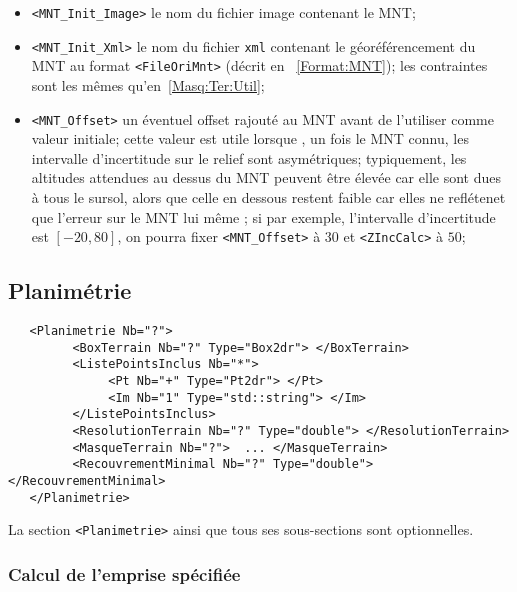 \begin{itemize}
   \item {\tt <MNT\_Init\_Image>} le nom du fichier image contenant le MNT;

   \item {\tt <MNT\_Init\_Xml>} le nom du fichier {\tt xml} contenant
         le g\'eor\'ef\'erencement du MNT au format {\tt <FileOriMnt>} 
         (d\'ecrit en ~\ref{Format:MNT}); les contraintes sont les 
         m\^emes qu'en~\ref{Masq:Ter:Util};

   \item {\tt <MNT\_Offset>} un \'eventuel offset rajout\'e au MNT
          avant de l'utiliser comme valeur initiale;
         cette valeur est utile lorsque , un fois
         le MNT connu, les  intervalle d'incertitude
         sur le relief sont asym\'etriques; typiquement, les altitudes
         attendues au dessus du MNT peuvent \^etre \'elev\'ee car elle
         sont dues \`a tous le sursol, alors que celle en dessous
         restent faible car elles ne
         refl\'etenet que  l'erreur sur le MNT lui m\^eme ;
         si par exemple, l'intervalle d'incertitude est $[-20,80]$,
         on pourra fixer  {\tt <MNT\_Offset>}  \`a $30$ et {\tt <ZIncCalc>}
         \`a $50$;
\end{itemize}


\subsection{Planim\'etrie}

\label{Autresec:Planimetrie}

\begin{verbatim}
   <Planimetrie Nb="?">
         <BoxTerrain Nb="?" Type="Box2dr"> </BoxTerrain>
         <ListePointsInclus Nb="*">
              <Pt Nb="+" Type="Pt2dr"> </Pt>
              <Im Nb="1" Type="std::string"> </Im>
         </ListePointsInclus>
         <ResolutionTerrain Nb="?" Type="double"> </ResolutionTerrain>
         <MasqueTerrain Nb="?">  ... </MasqueTerrain>
         <RecouvrementMinimal Nb="?" Type="double">  </RecouvrementMinimal>
   </Planimetrie>
\end{verbatim}

La section {\tt <Planimetrie>} ainsi que tous ses sous-sections
sont optionnelles.

\subsubsection{Calcul de l'emprise sp\'ecifi\'ee}

